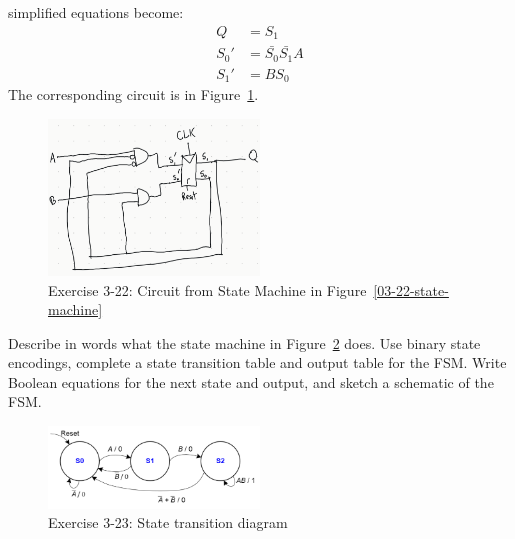\documentclass[12pt]{article}
\newenvironment{ex}[2][Exercise]{\begin{trivlist}
		\item[\hskip \labelsep {\bfseries #1}\hskip \labelsep {\bfseries #2.}]}{\end{trivlist}}
\newenvironment{sol}[1][Solution]{\begin{trivlist}
		\item[\hskip \labelsep {\bfseries #1:}]}{\end{trivlist}}
\begin{document}
\begin{sol}
	simplified equations become:
	\begin{align*}
		Q&=S_1\\
		S_0'&=\bar{S_0}\bar{S_1}A\\
		S_1'&=BS_0
	\end{align*}
	The corresponding circuit is in Figure~\ref{03-22-circuit}.
	\begin{figure}
		\centering
		\includegraphics[width=0.5\textwidth]{03-22-circuit-schematic}
		\caption{Exercise 3-22: Circuit from State Machine in
			Figure~\ref{03-22-state-machine}}
		\label{03-22-circuit}
	\end{figure}
\end{sol}

\begin{ex}{3.23}
	Describe in words what the state machine in Figure~\ref{03-23-state-machine} does. Use binary state encodings,
	complete a state transition table and output table for the FSM.
	Write Boolean equations for the next state and output, and sketch
	a schematic of the FSM.
	\begin{figure}
		\centering
		\includegraphics[width=0.5\textwidth]{03-23-state-machine}
		\caption{Exercise 3-23: State transition diagram}
		\label{03-23-state-machine}
	\end{figure}
\end{ex}
\end{document}
